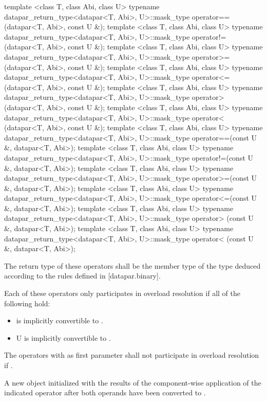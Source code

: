 \begin{itemdecl}
template <class T, class Abi, class U>
typename datapar_return_type<datapar<T, Abi>, U>::mask_type operator==(datapar<T, Abi>, const U &);
template <class T, class Abi, class U>
typename datapar_return_type<datapar<T, Abi>, U>::mask_type operator!=(datapar<T, Abi>, const U &);
template <class T, class Abi, class U>
typename datapar_return_type<datapar<T, Abi>, U>::mask_type operator>=(datapar<T, Abi>, const U &);
template <class T, class Abi, class U>
typename datapar_return_type<datapar<T, Abi>, U>::mask_type operator<=(datapar<T, Abi>, const U &);
template <class T, class Abi, class U>
typename datapar_return_type<datapar<T, Abi>, U>::mask_type operator> (datapar<T, Abi>, const U &);
template <class T, class Abi, class U>
typename datapar_return_type<datapar<T, Abi>, U>::mask_type operator< (datapar<T, Abi>, const U &);
template <class T, class Abi, class U>
typename datapar_return_type<datapar<T, Abi>, U>::mask_type operator==(const U &, datapar<T, Abi>);
template <class T, class Abi, class U>
typename datapar_return_type<datapar<T, Abi>, U>::mask_type operator!=(const U &, datapar<T, Abi>);
template <class T, class Abi, class U>
typename datapar_return_type<datapar<T, Abi>, U>::mask_type operator>=(const U &, datapar<T, Abi>);
template <class T, class Abi, class U>
typename datapar_return_type<datapar<T, Abi>, U>::mask_type operator<=(const U &, datapar<T, Abi>);
template <class T, class Abi, class U>
typename datapar_return_type<datapar<T, Abi>, U>::mask_type operator> (const U &, datapar<T, Abi>);
template <class T, class Abi, class U>
typename datapar_return_type<datapar<T, Abi>, U>::mask_type operator< (const U &, datapar<T, Abi>);
\end{itemdecl}
\begin{itemdescr}
  \pnum\remarks The return type of these operators shall be the  member type of the type deduced according to the rules defined in [datapar.binary].

  \pnum\remarks Each of these operators only participates in overload resolution if all of the following hold:
  \begin{itemize}
    \item \datapar{} is implicitly convertible to .
    \item \type U is implicitly convertible to .
  \end{itemize}

  \pnum\remarks The operators with  as first parameter shall not participate in overload resolution if .

  \pnum\returns A new \mask object initialized with the results of the component-wise application of the indicated operator after both operands have been converted to .
\end{itemdescr}

